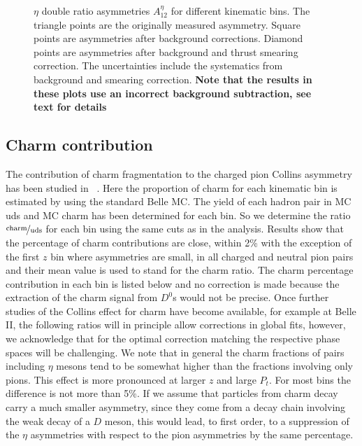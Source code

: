 \begin{figure}[H]
  \caption{$\eta$ double ratio asymmetries $A^{\eta}_{12}$ for different kinematic bins. The triangle points are the originally measured asymmetry. Square points are asymmetries after background corrections. Diamond points are asymmetries after background and thrust smearing correction. The uncertainties include the systematics from background and smearing correction. {\bf Note that the results in these plots use an incorrect background subtraction, see text for details}}
  \label{fig:etaresult}
\end{figure}


\subsection{Charm contribution}
\label{sec:charmcontribution}
The contribution of charm fragmentation to the charged pion Collins asymmetry has been studied in ~\cite{ChargedPionResult2}. 
Here the proportion of charm for each kinematic bin is estimated by using the standard Belle MC. The yield of each hadron pair in MC uds and MC charm has been determined for each bin. So we determine the ratio $\nicefrac{\mathrm{charm}}{\mathrm{uds}}$ for each bin using the same cuts as in the analysis. Results show that the percentage of charm contributions are close, within 2\% with the exception of the first $z$ bin where asymmetries are small, in all charged and neutral pion pairs and their mean value is used to stand for the charm ratio. The charm percentage contribution in each bin is listed below and no correction is made because the extraction of the charm signal from $D^0$s would not be precise. Once further studies of the Collins effect for charm have become available, for example at Belle II, the following ratios will in principle allow corrections in global fits, however, we acknowledge that for the optimal correction matching the respective phase spaces will be challenging.
We note that in general the charm fractions of pairs including $\eta$ mesons tend to be somewhat higher than the fractions involving only pions. This effect is more pronounced at larger $z$ and large $P_t$. For most bins the difference is not more than 5\%. If we assume that particles from charm decay carry a much smaller asymmetry, since they come from a decay chain involving the weak decay of a $D$ meson, this would lead, to first order, to a suppression of the $\eta$ asymmetries with respect to the pion asymmetries by the same percentage.


